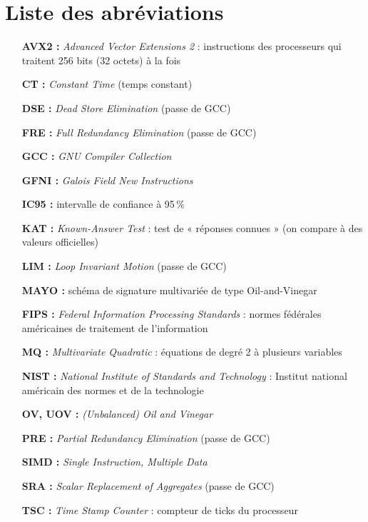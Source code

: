 \chapter*{Liste des abréviations}
\begin{itemize}[leftmargin=1.2cm,itemsep=2pt]
\item[\textbf{AVX2 :}] \emph{Advanced Vector Extensions 2} : instructions des processeurs qui traitent 256 bits (32 octets) à la fois
\item[\textbf{CT :}] \emph{Constant Time} (temps constant)
\item[\textbf{DSE :}] \emph{Dead Store Elimination} (passe de GCC)
\item[\textbf{FRE :}] \emph{Full Redundancy Elimination} (passe de GCC)
\item[\textbf{GCC :}] \emph{GNU Compiler Collection}
\item[\textbf{GFNI :}] \emph{Galois Field New Instructions}
\item[\textbf{IC95 :}] intervalle de confiance à 95\,\%
\item[\textbf{KAT :}] \emph{Known-Answer Test} : test de « réponses connues » (on compare à des valeurs officielles)
\item[\textbf{LIM :}] \emph{Loop Invariant Motion} (passe de GCC)
\item[\textbf{MAYO :}] schéma de signature multivariée de type Oil-and-Vinegar
\item[\textbf{FIPS :}] \emph{Federal Information Processing Standards} : normes fédérales américaines de traitement de l'information
\item[\textbf{MQ :}] \emph{Multivariate Quadratic} : équations de degré 2 à plusieurs variables
\item[\textbf{NIST :}] \emph{National Institute of Standards and Technology} : Institut national américain des normes et de la technologie
\item[\textbf{OV, UOV :}] \emph{(Unbalanced) Oil and Vinegar}
\item[\textbf{PRE :}] \emph{Partial Redundancy Elimination} (passe de GCC)
\item[\textbf{SIMD :}] \emph{Single Instruction, Multiple Data}
\item[\textbf{SRA :}] \emph{Scalar Replacement of Aggregates} (passe de GCC)
\item[\textbf{TSC :}] \emph{Time Stamp Counter} : compteur de ticks du processeur
\end{itemize}


